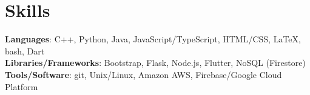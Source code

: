 \documentclass{article}
\begin{document}
\section*{Skills}
\textbf{Languages}: C++, Python, Java, JavaScript/TypeScript, HTML/CSS, {\selectfont\LaTeX}, bash, Dart\\
\textbf{Libraries/Frameworks}: Bootstrap, Flask, Node.js, Flutter, NoSQL (Firestore)\\
\textbf{Tools/Software}: git, Unix/Linux, Amazon AWS, Firebase/Google Cloud Platform
\end{document}
